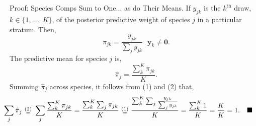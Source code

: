\documentclass[ xcolor = pdftex, dvipsnames, table ]{beamer}
\begin{document}
\subsection{}
\begin{frame}{Proof: Species Comps Sum to One... as do Their Means.}
%
If $y_{jk}$ is the $k^{\text{th}}$ draw, $k\in\{1,...,~K\}$, of the posterior predictive weight of species $j$ in a particular stratum. Then,
%
\begin{equation}
\pi_{jk} = \frac{y_{jk}}{\sum_j y_{jk}} ~~~ \bm{y}_{k}\neq \bm{0}.
\end{equation}
The predictive mean for species $j$ is,
\begin{equation}
        \hat\pi_{j} = \frac{\sum_k^K \pi_{jk}}{K}. 
\end{equation}
Summing $\hat\pi_{j}$ across species, it follows from (1) and (2) that,
\begin{equation*}
        \hspace*{-0.8cm}
        \sum_j \hat\pi_{j} ~\substack{(2)\\=}~ \sum_j\frac{\sum_k^K \pi_{jk}}{K} = \frac{\sum_k^K \sum_j \pi_{jk}}{K}~\substack{(1)\\=}~\frac{\sum_k^K \sum_j \frac{y_{jk}}{\sum_j y_{jk}}}{K} = \frac{\sum_k^K 1}{K} = \frac{K}{K}=1. ~~~\blacksquare
\end{equation*}
%
\end{frame}

%
%

%
\end{document}
